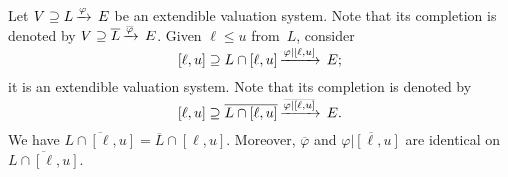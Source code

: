 %
%
\begin{prop}
\label{P:restriction}
Let $V \supseteq L\,\smash{\xrightarrow{\varphi}\,E}$ be an extendible valuation system.
Note that its completion is denoted by
$V \supseteq \overline L\,\smash{\xrightarrow{\overline \varphi}\,E}$.
Given $\ell \leq u$ from~$L$,
consider
\begin{equation*}
[\ell,u] \supseteq L\cap{[\ell, u]}\,\smash{\xrightarrow{\varphi|[\ell,u]}\,E};
\end{equation*}
it is an extendible valuation system.
Note that its completion is denoted by
\begin{equation*}
[\ell,u] \supseteq \overline{L\cap[\ell,u]}\,\smash{\xrightarrow{\overline{\varphi|[\ell,u]}}\,E}.
\end{equation*}
We have $\overline{L\cap [\ell, u]} = \overline{L}\cap [\ell,u]$.
Moreover,
 $\overline{\varphi}$ and $\overline{\varphi|[\ell,u]}$
are identical on $\overline{L\cap [\ell,u]}$.
\end{prop}
